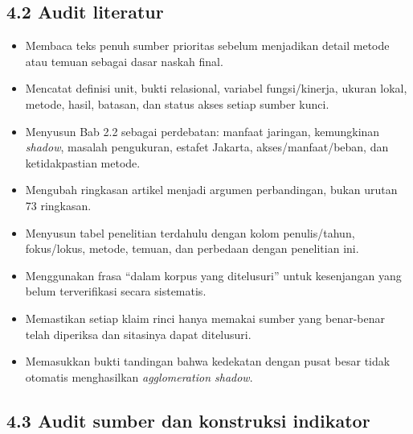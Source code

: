 \documentclass[
  indonesian,
  11pt,
]{article}
\providecommand{\tightlist}{%
  \setlength{\itemsep}{0pt}\setlength{\parskip}{0pt}}
\renewcommand{\tightlist}{%
  \setlength{\itemsep}{0.22em}%
  \setlength{\parskip}{0pt}%
}
\begin{document}
\subsection{4.2 Audit literatur}\label{audit-literatur}

\begin{itemize}
\tightlist
\item[$\square$]
  Membaca teks penuh sumber prioritas sebelum menjadikan detail metode
  atau temuan sebagai dasar naskah final.
\item[$\square$]
  Mencatat definisi unit, bukti relasional, variabel fungsi/kinerja,
  ukuran lokal, metode, hasil, batasan, dan status akses setiap sumber
  kunci.
\item[$\square$]
  Menyusun Bab 2.2 sebagai perdebatan: manfaat jaringan, kemungkinan
  \emph{shadow}, masalah pengukuran, estafet Jakarta,
  akses/manfaat/beban, dan ketidakpastian metode.
\item[$\square$]
  Mengubah ringkasan artikel menjadi argumen perbandingan, bukan urutan
  73 ringkasan.
\item[$\square$]
  Menyusun tabel penelitian terdahulu dengan kolom penulis/tahun,
  fokus/lokus, metode, temuan, dan perbedaan dengan penelitian ini.
\item[$\square$]
  Menggunakan frasa ``dalam korpus yang ditelusuri'' untuk kesenjangan
  yang belum terverifikasi secara sistematis.
\item[$\square$]
  Memastikan setiap klaim rinci hanya memakai sumber yang benar-benar
  telah diperiksa dan sitasinya dapat ditelusuri.
\item[$\square$]
  Memasukkan bukti tandingan bahwa kedekatan dengan pusat besar tidak
  otomatis menghasilkan \emph{agglomeration shadow}.
\end{itemize}

\subsection{4.3 Audit sumber dan konstruksi
indikator}\label{audit-sumber-dan-konstruksi-indikator}
\end{document}

